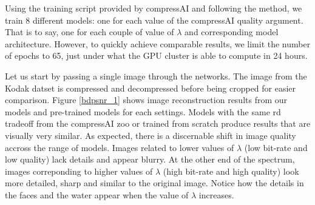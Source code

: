 Using the training script provided by compressAI and following the method, we train 8 different models: one for each value of the compressAI \textsf{quality} argument. That is to say, one for each couple of value of \(\lambda\) and corresponding model architecture. However, to quickly achieve comparable results, we limit the number of epochs to 65, just under what the GPU cluster is able to compute in 24 hours.

Let us start by passing a single image through the networks. The image from the Kodak datset is compressed and decompressed before being cropped for easier comparison. Figure \ref{bdpsnr_1} shows image reconstruction results from our models and pre-trained models for each settings. Models with the same \acrshort{rd} tradeoff from the compressAI zoo or trained from scratch produce results that are visually very similar. As expected, there is a discernable shift in image quality accross the range of models. Images related to lower values of \(\lambda\) (low bit-rate and low quality) lack details and appear blurry. At the other end of the spectrum, images correponding to higher values of \(\lambda\) (high bit-rate and high quality) look more detailed, sharp and similar to the original image. Notice how the details in the faces and the water appear when the value of \(\lambda\) increases.

